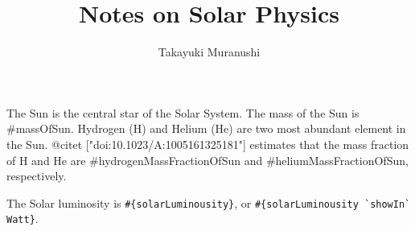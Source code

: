 \documentclass{article}
\title{Notes on Solar Physics}
\author{Takayuki Muranushi}
\begin{document}
\maketitle

The Sun is the central star of the Solar System.
The mass of the Sun is #{massOfSun}. 
Hydrogen (H) and Helium (He) are two most abundant element in the Sun.
@{citet ["doi:10.1023/A:1005161325181"]} estimates that the mass fraction of H and He are
#{hydrogenMassFractionOfSun} and
#{heliumMassFractionOfSun}, respectively.

The Solar luminosity is \verb!#{solarLuminousity}!, or
 \verb!#{solarLuminousity `showIn` Watt}!.






\end{document}
